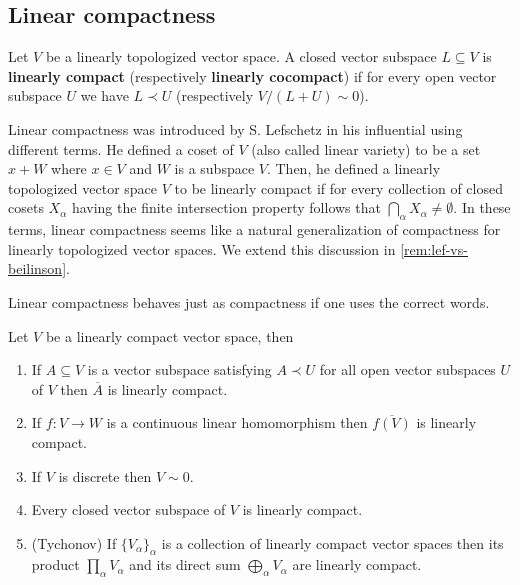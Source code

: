 \subsection{Linear compactness}
\begin{definition}\label{def:linear_compactness}
	Let $V$ be a linearly topologized vector space. A closed vector subspace $L \subseteq V$ is \textbf{linearly compact} (respectively \textbf{linearly cocompact}) if for every open vector subspace $U$ we have $L \prec U$ (respectively $V/(L+U) \sim 0$). 
\end{definition}
\begin{remark}\label{rem:lefschetz-linear-compactness}
	Linear compactness was introduced by S. Lefschetz in his influential \cite{Lefschetz-Alg-Top} using different terms. He defined a coset of $V$ (also called linear variety) to be a set $x + W$ where $x\in V$ and $W$ is a subspace $V$. Then, he defined a linearly topologized vector space $V$ to be linearly compact if for every collection of closed cosets $X_{\alpha}$ having the finite intersection property follows that $\bigcap_{\alpha} X_{\alpha} \neq \emptyset$. In these terms, linear compactness seems like a natural generalization of compactness for linearly topologized vector spaces. We extend this discussion in \cref{rem:lef-vs-beilinson}.
\end{remark}
Linear compactness behaves just as compactness if one uses the correct words.
\begin{theorem}\label{thm:linear_compactness_properties}
	Let $V$ be a linearly compact vector space, then
	\begin{enumerate}[label = (\alph*)]
		\item If $A \subseteq V$ is a vector subspace satisfying $A \prec U$ for all open vector subspaces $U$ of $V$ then $\overline{A}$ is linearly compact.
		\item If $f\colon V \to W$ is a continuous linear homomorphism then $\overline{f(V)}$ is linearly compact.
		\item If $V$ is discrete then $V \sim 0$.
		\item Every closed vector subspace of $V$ is linearly compact.
		\item (Tychonov) If $\{V_{\alpha}\}_{\alpha}$ is a collection of linearly compact vector spaces then its product $\prod_{\alpha} V_{\alpha}$ and its direct sum $\bigoplus_{\alpha}V_{\alpha}$ are linearly compact.
	\end{enumerate}
\end{theorem}
